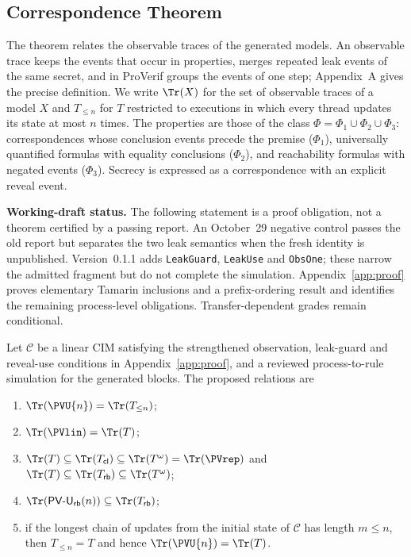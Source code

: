 \subsection{Correspondence Theorem}\label{sec:method:thm}

The theorem relates the observable traces of the generated models. An observable trace keeps the events that occur in properties, merges repeated leak events of the same secret, and in ProVerif groups the events of one step; Appendix~A gives the precise definition. We write $\Tr(X)$ for the set of observable traces of a model $X$ and $T_{\le n}$ for $T$ restricted to executions in which every thread updates its state at most $n$ times. The properties are those of the class $\Phi = \Phi_1 \cup \Phi_2 \cup \Phi_3$: correspondences whose conclusion events precede the premise ($\Phi_1$), universally quantified formulas with equality conclusions ($\Phi_2$), and reachability formulas with negated events ($\Phi_3$). Secrecy is expressed as a correspondence with an explicit reveal event.

\noindent\textbf{Working-draft status.} The following statement is a proof obligation, not a theorem certified by a passing report. An October~29 negative control passes the old report but separates the two leak semantics when the fresh identity is unpublished. Version~0.1.1 adds \texttt{LeakGuard}, \texttt{LeakUse} and \texttt{ObsOne}; these narrow the admitted fragment but do not complete the simulation. Appendix~\ref{app:proof} proves elementary Tamarin inclusions and a prefix-ordering result and identifies the remaining process-level obligations. Transfer-dependent grades remain conditional.

\begin{Theorem}\label{thm:chain}
Let $\mathcal{C}$ be a linear CIM satisfying the strengthened observation, leak-guard and reveal-use conditions in Appendix~\ref{app:proof}, and a reviewed process-to-rule simulation for the generated blocks. The proposed relations are
\begin{enumerate}[label=(\alph*)]
\item $\Tr(\PVU{n}) = \Tr(T_{\le n})$;
\item $\Tr(\PVlin) = \Tr(T)$;
\item $\Tr(T) \subseteq \Tr(T_{\mathsf{cl}}) \subseteq \Tr(T^{\omega}) = \Tr(\PVrep)$ and $\Tr(T) \subseteq \Tr(T_{\mathsf{rb}}) \subseteq \Tr(T^{\omega})$;
\item $\Tr(\textsf{PV-U}_{\mathsf{rb}}(n)) \subseteq \Tr(T_{\mathsf{rb}})$;
\item if the longest chain of updates from the initial state of $\mathcal{C}$ has length $m \le n$, then $T_{\le n} = T$ and hence $\Tr(\PVU{n}) = \Tr(T)$.
\end{enumerate}
\end{Theorem}

